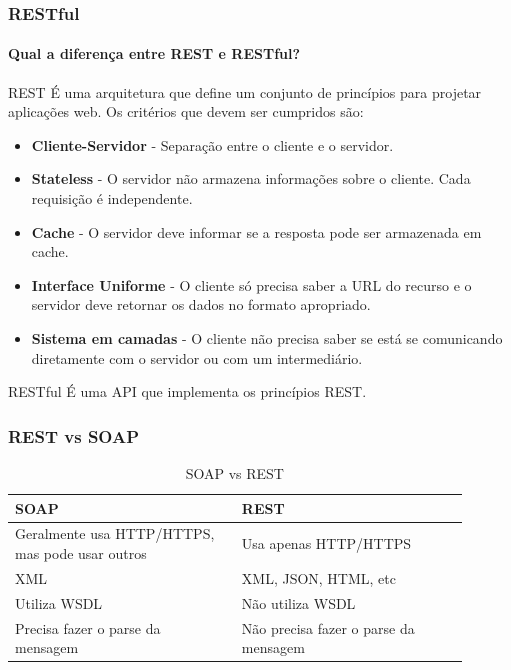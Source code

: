 \documentclass[
	10pt, %
	t, %
]{beamer}
\begin{document}
\begin{frame}
	\frametitle{RESTful}
	\framesubtitle{Qual a diferença entre REST e RESTful?}

	\begin{block}{REST}
		É uma \alert{arquitetura} que define um conjunto de princípios para projetar aplicações web.
		Os critérios que devem ser cumpridos são:
		\begin{itemize}
			\item \textbf{Cliente-Servidor} - Separação entre o cliente e o servidor.
			\item \textbf{Stateless} - O servidor não armazena informações sobre o cliente. Cada requisição é independente.
			\item \textbf{Cache} - O servidor deve informar se a resposta pode ser armazenada em cache.
			\item \textbf{Interface Uniforme} - O cliente só precisa saber a URL do recurso e o servidor deve retornar os dados no formato apropriado.
			\item \textbf{Sistema em camadas} - O cliente não precisa saber se está se comunicando diretamente com o servidor ou com um intermediário.
		\end{itemize}
	
	\end{block}

	\begin{block}{RESTful}
		É uma API que \alert{implementa os princípios REST}.
	\end{block}
	
	
\end{frame}

\begin{frame}
	\frametitle{REST vs SOAP}
	
	\begin{table}
		\renewcommand{\arraystretch}{1.5} %
		\begin{tabular}{|p{0.45\linewidth}|p{0.45\linewidth}|}
			\hline
			\textbf{SOAP} & \textbf{REST} \\ \hline
			Geralmente usa HTTP/HTTPS, mas pode usar outros & Usa apenas HTTP/HTTPS \\ \hline
			XML & XML, JSON, HTML, etc \\ \hline
			Utiliza WSDL & Não utiliza WSDL \\ \hline
			Precisa fazer o parse da mensagem & Não precisa fazer o parse da mensagem \\ \hline
		\end{tabular}
		\caption{SOAP vs REST}
		\label{tab:soap_rest}

	\end{table}

\end{frame}
\end{document}
